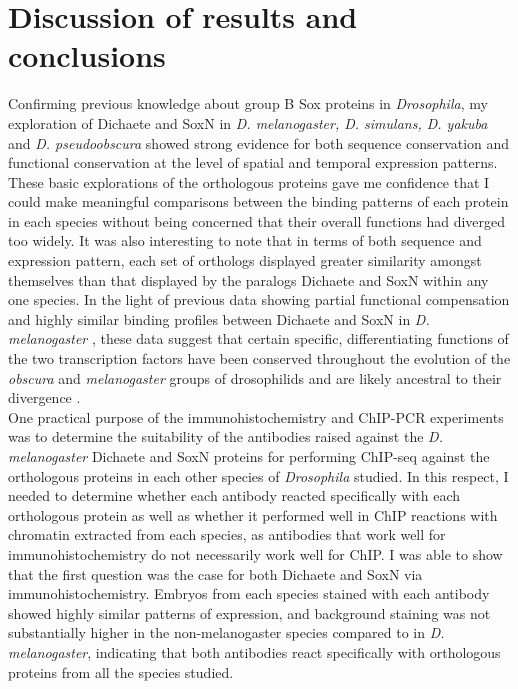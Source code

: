 \section{Discussion of results and conclusions}
Confirming previous knowledge about group B Sox proteins in \emph{Drosophila}, my exploration of Dichaete and SoxN in \emph{D. melanogaster, D. simulans, D. yakuba} and \emph{D. pseudoobscura} showed strong evidence for both sequence conservation and functional conservation at the level of spatial and temporal expression patterns. These basic explorations of the orthologous proteins gave me confidence that I could make meaningful comparisons between the binding patterns of each protein in each species without being concerned that their overall functions had diverged too widely. It was also interesting to note that in terms of both sequence and expression pattern, each set of orthologs displayed greater similarity amongst themselves than that displayed by the paralogs Dichaete and SoxN within any one species. In the light of previous data showing partial functional compensation and highly similar binding profiles between Dichaete and SoxN in \emph{D. melanogaster} \citep{ferrero_soxneuro_2014,overton_drosophila_2007}, these data suggest that certain specific, differentiating functions of the two transcription factors have been conserved throughout the evolution of the \emph{obscura} and \emph{melanogaster} groups of drosophilids and are likely ancestral to their divergence \citep{russo_molecular_1995}.\\

One practical purpose of the immunohistochemistry and ChIP-PCR experiments was to determine the suitability of the antibodies raised against the \emph{D. melanogaster} Dichaete and SoxN proteins for performing ChIP-seq against the orthologous proteins in each other species of \emph{Drosophila} studied. In this respect, I needed to determine whether each antibody reacted specifically with each orthologous protein as well as whether it performed well in ChIP reactions with chromatin extracted from each species, as antibodies that work well for immunohistochemistry do not necessarily work well for ChIP. I was able to show that the first question was the case for both Dichaete and SoxN via immunohistochemistry. Embryos from each species stained with each antibody showed highly similar patterns of expression, and background staining was not substantially higher in the non-melanogaster species compared to in \emph{D. melanogaster}, indicating that both antibodies react specifically with orthologous proteins from all the species studied.\\


